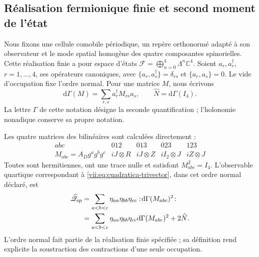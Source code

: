 \subsection{Réalisation fermionique finie et second moment de l'état}
\label{vii:subsec:segundo-momento-car}

Nous fixons une cellule comobile périodique, un repère orthonormé adapté à son
observateur et le mode spatial homogène des quatre composantes
spinorielles. Cette réalisation finie a pour espace d'états
\(\mathcal F=\bigoplus_{n=0}^4\Lambda^n\mathbb C^4\).
Soient \(a_r,a_r^\dagger\), \(r=1,\ldots,4\), ses opérateurs
canoniques, avec
\(\{a_r,a_s^\dagger\}=\delta_{rs}\) et
\(\{a_r,a_s\}=0\). Le vide d'occupation fixe l'ordre
normal. Pour une matrice \(M\), nous écrivons
\[
 \mathrm d\Gamma(M)=\sum_{r,s}a_r^\dagger M_{rs}a_s,
 \qquad \widehat N=\mathrm d\Gamma(I_4).
\]
La lettre \(\Gamma\) de cette notation désigne la seconde
quantification ; l'holonomie nonadique conserve sa propre notation.

Les quatre matrices des bilinéaires sont calculées directement :
\begin{equation}
 \begin{array}{c|cccc}
 abc&012&013&023&123\\ \hline
 M_{abc}=A_Dg^ag^bg^c
       &iJ\otimes R&iJ\otimes Z&iI_2\otimes J&iZ\otimes J
 \end{array}
 \label{vii:eq:matrices-bilineales-espin}
\end{equation}
Toutes sont hermitiennes, ont une trace nulle et satisfont \(M_{abc}^2=I_4\). L'observable quartique correspondant à \eqref{vii:eq:cuadratica-trivector}, dans cet ordre normal déclaré, est
\begin{equation}
 \begin{split}
 \widehat{\mathscr Q}_{\rm sp}
 &=\sum_{a<b<c}\eta_{aa}\eta_{bb}\eta_{cc}
       :\!\mathrm d\Gamma(M_{abc})^2\!:\\
 &=\sum_{a<b<c}\eta_{aa}\eta_{bb}\eta_{cc}
       \mathrm d\Gamma(M_{abc})^2+2\widehat N.
 \end{split}
 \label{vii:eq:observable-cuadratico-espin}
\end{equation}
L'ordre normal fait partie de la réalisation finie spécifiée ;
sa définition rend explicite la soustraction des contractions
d'une seule occupation.

